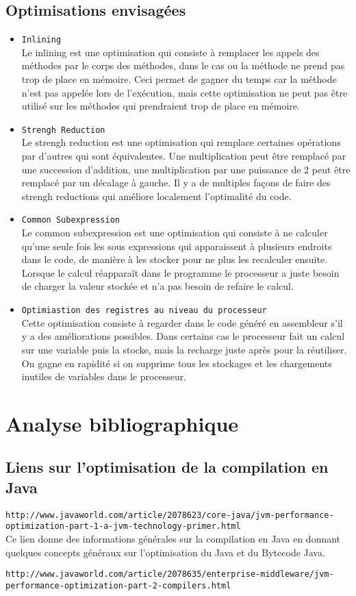 \documentclass[a4paper]{article}
\begin{document}
\subsection{Optimisations envisagées}
\begin{itemize}
\item \texttt{Inlining} \\
Le inlining est une optimisation qui consiste à remplacer les appels des méthodes par le corps des méthodes, dans le cas ou la méthode ne prend pas trop de place en mémoire. Ceci permet de gagner du temps car la méthode n'est pas appelée lors de l'exécution, mais cette optimisation ne peut pas être utilisé sur les méthodes qui prendraient trop de place en mémoire.
\item \texttt{Strengh Reduction} \\
Le strengh reduction est une optimisation qui remplace certaines opérations par d'autres qui sont équivalentes. Une multiplication peut être remplacé par une succession d'addition, une multiplication par une puissance de 2 peut être remplacé par un décalage à gauche. Il y a de multiples façons de faire des strengh reductions qui améliore localement l'optimalité du code.
\item \texttt{Common Subexpression} \\
Le common subexpression est une optimisation qui consiste à ne calculer qu'une seule fois les sous expressions qui apparaissent à plusieurs endroits dans le code, de manière à les stocker pour ne plus les recalculer ensuite. Lorsque le calcul réapparaît dans le programme le processeur a juste besoin de charger la valeur stockée et n'a pas besoin de refaire le calcul.
\item \texttt{Optimiastion des registres au niveau du processeur} \\
Cette optimisation consiste à regarder dans le code généré en assembleur s'il y a des améliorations possibles. Dans certains cas le processeur fait un calcul sur une variable puis la stocke, mais la recharge juste après pour la réutiliser. On gagne en rapidité si on supprime tous les stockages et les chargements inutiles de variables dans le processeur. 
     \end{itemize}
\section{Analyse bibliographique}
\subsection{Liens sur l'optimisation de la compilation en Java}
\item \texttt{http://www.javaworld.com/article/2078623/core-java/jvm-performance-optimization-part-1-a-jvm-technology-primer.html} \\
Ce lien donne des informations générales sur la compilation en Java en donnant quelques concepts généraux sur l'optimisation du Java et du Bytecode Java.
\item \texttt{http://www.javaworld.com/article/2078635/enterprise-middleware/jvm-performance-optimization-part-2-compilers.html} \\
\end{document}
